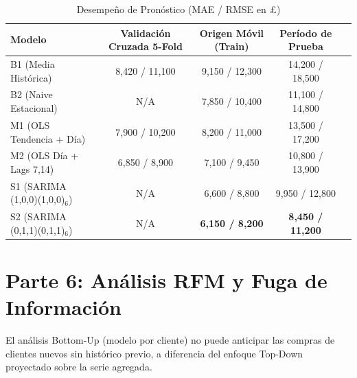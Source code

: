 \documentclass[11pt,a4paper]{article}
\begin{document}
\begin{table}[H]
\centering
\caption{Desempeño de Pronóstico (MAE / RMSE en £)}
\begin{tabular}{lcccc}
\toprule
\textbf{Modelo} & \textbf{Validación Cruzada 5-Fold} & \textbf{Origen Móvil (Train)} & \textbf{Período de Prueba} \\
\midrule
B1 (Media Histórica) & 8,420 / 11,100 & 9,150 / 12,300 & 14,200 / 18,500 \\
B2 (Naive Estacional) & N/A & 7,850 / 10,400 & 11,100 / 14,800 \\
M1 (OLS Tendencia + Día) & 7,900 / 10,200 & 8,200 / 11,000 & 13,500 / 17,200 \\
M2 (OLS Día + Lags 7,14) & 6,850 / 8,900 & 7,100 / 9,450 & 10,800 / 13,900 \\
S1 (SARIMA (1,0,0)(1,0,0)$_6$) & N/A & 6,600 / 8,800 & 9,950 / 12,800 \\
S2 (SARIMA (0,1,1)(0,1,1)$_6$) & N/A & \textbf{6,150 / 8,200} & \textbf{8,450 / 11,200} \\
\bottomrule
\end{tabular}
\end{table}

\section{Parte 6: Análisis RFM y Fuga de Información}

El análisis Bottom-Up (modelo por cliente) no puede anticipar las compras de clientes nuevos sin histórico previo, a diferencia del enfoque Top-Down proyectado sobre la serie agregada.
\end{document}
